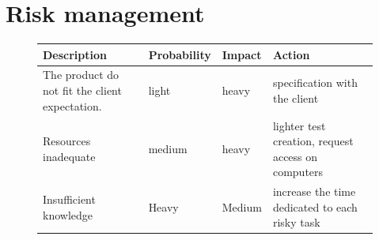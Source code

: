 \documentclass[12pt]{article} %
\begin{document}
\section{Risk management}
\begin{figure}[htb]

\begin{center}
\begin{tabular}{|p{5cm}|p{3cm}|p{2cm}|p{5cm}|} 
\hline \textbf{Description} &  \textbf{Probability} &  \textbf{Impact} & \textbf{Action} \\
\hline  The product do not fit the client expectation. &  light & heavy &  specification with the client \\
\hline Resources inadequate & medium & heavy & lighter test creation, request access on computers \\
\hline Insufficient knowledge & Heavy & Medium & increase the time dedicated to each risky task \\
\hline
\end{tabular}
\end{center}
\end{figure}
\end{document}
